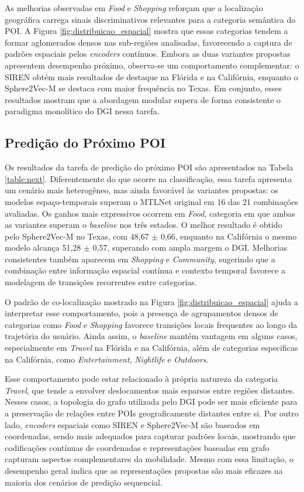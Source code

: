 As melhorias observadas em \textit{Food} e \textit{Shopping} reforçam que a localização geográfica carrega sinais discriminativos relevantes para a categoria semântica do POI. A Figura \ref{fig:distribuicao_espacial} mostra que essas categorias tendem a formar aglomerados densos nas sub-regiões analisadas, favorecendo a captura de padrões espaciais pelos \textit{encoders} contínuos. Embora as duas variantes propostas apresentem desempenho próximo, observa-se um comportamento complementar: o SIREN obtém mais resultados de destaque na Flórida e na Califórnia, enquanto o Sphere2Vec-M se destaca com maior frequência no Texas. Em conjunto, esses resultados mostram que a abordagem modular supera de forma consistente o paradigma monolítico do DGI nessa tarefa.



\subsection{Predição do Próximo POI}

Os resultados da tarefa de predição do próximo POI são apresentados na Tabela \ref{table:next}. Diferentemente do que ocorre na classificação, essa tarefa apresenta um cenário mais heterogêneo, mas ainda favorável às variantes propostas: os modelos espaço-temporais superam o MTLNet original em 16 das 21 combinações avaliadas. Os ganhos mais expressivos ocorrem em \textit{Food}, categoria em que ambas as variantes superam o \textit{baseline} nos três estados. O melhor resultado é obtido pelo Sphere2Vec-M no Texas, com 48,67 $\pm$ 0,66, enquanto na Califórnia o mesmo modelo alcança 51,28 $\pm$ 0,57, superando com ampla margem o DGI. Melhorias consistentes também aparecem em \textit{Shopping} e \textit{Community}, sugerindo que a combinação entre informação espacial contínua e contexto temporal favorece a modelagem de transições recorrentes entre categorias.

O padrão de co-localização mostrado na Figura \ref{fig:distribuicao_espacial} ajuda a interpretar esse comportamento, pois a presença de agrupamentos densos de categorias como \textit{Food} e \textit{Shopping} favorece transições locais frequentes ao longo da trajetória do usuário. Ainda assim, o \textit{baseline} mantém vantagem em alguns casos, especialmente em \textit{Travel} na Flórida e na Califórnia, além de categorias específicas na Califórnia, como \textit{Entertainment}, \textit{Nightlife} e \textit{Outdoors}.

Esse comportamento pode estar relacionado à própria natureza da categoria \textit{Travel}, que tende a envolver deslocamentos mais esparsos entre regiões distantes. Nesses casos, a topologia do grafo utilizada pelo DGI pode ser mais eficiente para a preservação de relações entre POIs geograficamente distantes entre si. Por outro lado, \textit{encoders} espaciais como SIREN e Sphere2Vec-M são baseados em coordenadas, sendo mais adequados para capturar padrões locais, mostrando que codificações contínuas de coordenadas e representações baseadas em grafo capturam aspectos complementares da mobilidade. Mesmo com essa limitação, o desempenho geral indica que as representações propostas são mais eficazes na maioria dos cenários de predição sequencial.
